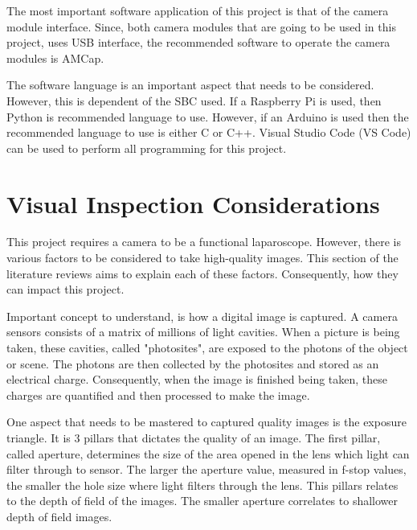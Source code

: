  The most important software application of this project is that of the camera module interface. Since, both camera modules that are going to be used in this project, uses USB interface, the recommended software to operate the camera modules is AMCap. \citep{MR-P}


The software language is an important aspect that needs to be considered. However, this is dependent of the SBC used. If a Raspberry Pi is used, then Python is recommended language to use. \citep{RP-DOC} However, if an Arduino is used then the recommended language to use is either C or C++. \citep{A-DOC} Visual Studio Code (VS Code) can be used to perform all programming for this project.


\section{Visual Inspection Considerations}
\label{sec:Visual Inspection Considerations}

This project requires a camera to be a functional laparoscope. However, there is various factors to be considered to take high-quality images. This section of the literature reviews aims to explain each of these factors. Consequently, how they can impact this project.

Important concept to understand, is how a digital image is captured. A camera sensors consists of a matrix of millions of light cavities. When a picture is being taken, these cavities, called "photosites", are exposed to the photons of the object or scene. The photons are then collected by the photosites and stored as an electrical charge. Consequently, when the image is finished being taken, these charges are quantified and then processed to make the image. \citep{CC-DCS}

One aspect that needs to be mastered to captured quality images is the exposure triangle. It is 3 pillars that dictates the quality of an image. The first pillar, called aperture, determines the size of the area opened in the lens which light can filter through to sensor. The larger the aperture value, measured in f-stop values, the smaller the hole size where light filters through the lens. This pillars relates to the depth of field of the images. The smaller aperture correlates to shallower depth of field images. \citep{CC-CE}

